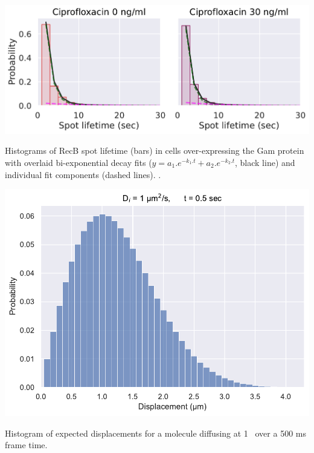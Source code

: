 \begin{suppfigure*}[htbp]
    \begin{center}
    \includegraphics[width=0.6\linewidth]{SI_Figures/Gam_lifetimes_fits.pdf}
    \end{center}
    \caption{Histograms of RecB spot lifetime (bars) in cells over-expressing the Gam protein with overlaid bi-exponential decay fits ($y=a_1.e^{-k_1.t} + a_2.e^{-k_2.t}$, black line) and individual fit components (dashed lines). . }
    \label{SIFig:Gam_RecB_lifetimes_fits}
\end{suppfigure*}

\begin{suppfigure*}[htbp]
    \begin{center}
    \includegraphics[width=.8\textwidth]{SI_Figures/Displacements_distribution.pdf}
    \end{center}
    \caption{Histogram of expected displacements for a molecule diffusing at 1 \ums\ over a 500 ms frame time.}
    \label{SIFig:displacement_simul}
\end{suppfigure*}

